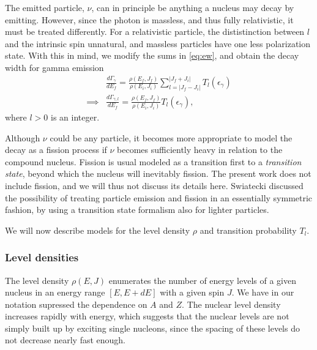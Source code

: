 
The emitted particle, $\nu$, can in principle be anything a nucleus may decay by emitting. However, since the photon is massless, and thus fully relativistic, it must be treated differently. For a relativistic particle, the dististinction between $l$ and the intrinsic spin unnatural, and massless particles have one less polarization state. With this in mind, we modify the sums in \eqref{eq:ew}, and obtain the decay width for gamma emission
\begin{align}
&\frac{d\Gamma_{\gamma}}{dE_f} = \frac{\rho(E_f,J_f)}{\rho(E_i,J_i)} \sum_{l=|J_f-J_i|}^{|J_f+J_i|} T_l(\epsilon_\gamma) \\
\implies & \frac{d\Gamma_{\gamma,l}}{dE_f} =\frac{\rho(E_f,J_f)}{\rho(E_i,J_i)} T_l(\epsilon_\gamma),\label{eq:gammagamma}
\end{align}
where $l>0$ is an integer.

Although $\nu$ could be any particle, it becomes more appropriate to model the decay as a fission process if $\nu$ becomes sufficiently heavy in relation to the compound nucleus. Fission is usual modeled as a transition first to a \emph{transition state}, beyond which the nucleus will inevitably fission\cite{krane:book}. The present work does not include fission, and we will thus not discuss its details here. Swiatecki discussed the possibility of treating particle emission and fission in an essentially symmetric fashion, by using a transition state formalism also for lighter particles\cite{swiatecki:1983:art}. 

We will now describe models for the level density $\rho$ and transition probability $T_l$.

\subsubsection{Level densities}
The level density $\rho(E,J)$ enumerates the number of energy levels of a given nucleus in an energy range $[E,E+dE]$ with a given spin $J$. We have in our notation supressed the dependence on $A$ and $Z$. The nuclear level density increases rapidly with energy, which suggests that the nuclear levels are not simply built up by exciting single nucleons, since the spacing of these levels do not decrease nearly fast enough.

